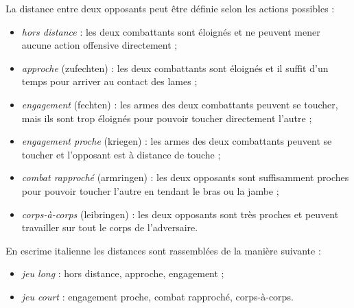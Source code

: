 \begin{definition}[Distances]

\noindent
La distance entre deux opposants peut être définie selon les actions possibles :
\begin{itemize}
	\item \emph{hors distance} : les deux combattants sont éloignés et ne peuvent mener aucune action offensive directement ;
	
	\item \emph{approche} (zufechten) : les deux combattants sont éloignés et il suffit d'un temps pour arriver au contact des lames ;
	
	\item \emph{engagement} (fechten) : les armes des deux combattants peuvent se toucher, mais ils sont trop éloignés pour pouvoir toucher directement l'autre ;
	
	\item \emph{engagement proche} (kriegen) : les armes des deux combattants peuvent se toucher et l'opposant est à distance de touche ;
	
	\item \emph{combat rapproché} (armringen) : les deux opposants sont suffisamment proches pour pouvoir toucher l'autre en tendant le bras ou la jambe ;
	
	\item \emph{corps-à-corps} (leibringen) : les deux opposants sont très proches et peuvent travailler sur tout le corps de l'adversaire.
\end{itemize}
\end{definition}


\begin{definition}

\noindent
En escrime italienne les distances sont rassemblées de la manière suivante :
\begin{itemize}
	\item \emph{jeu long} : hors distance, approche, engagement ;
	
	\item \emph{jeu court} : engagement proche, combat rapproché, corps-à-corps.
\end{itemize}
\end{definition}


